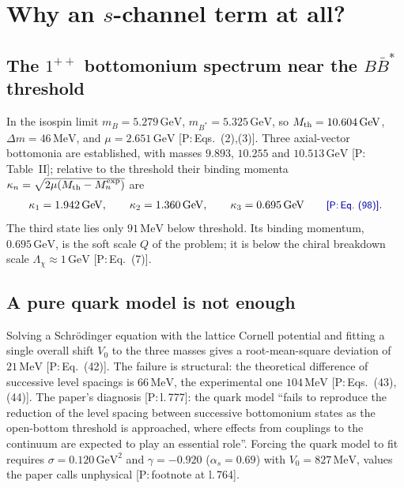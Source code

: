 \documentclass[11pt,a4paper]{article}
\newcommand{\tagP}[1]{\textcolor{blue!65!black}{\textsf{\small[P:\,#1]}}}
\newcommand{\Mth}{M_{\rm th}}
\renewcommand{\GeV}{\,\mathrm{GeV}}
\renewcommand{\MeV}{\,\mathrm{MeV}}
\begin{document}
\section{Why an $s$-channel term at all?}
\label{sec:why}

\subsection{The $1^{++}$ bottomonium spectrum near the $B\bar B^*$ threshold}

In the isospin limit $m_B=5.279\GeV$, $m_{B^*}=5.325\GeV$, so $\Mth=10.604\GeV$, $\Delta m=46\MeV$, and $\mu=2.651\GeV$ \tagP{Eqs.~(2),(3)}. Three axial-vector bottomonia are established, with masses $9.893$, $10.255$ and $10.513\GeV$ \tagP{Table~II}; relative to the threshold their binding momenta $\kappa_n=\sqrt{2\mu(\Mth-M_n^{\rm exp})}$ are
\begin{equation}
\kappa_1=1.942\GeV,\qquad \kappa_2=1.360\GeV,\qquad \kappa_3=0.695\GeV \qquad\text{\tagP{Eq.~(98)}}.
\end{equation}
The third state lies only $91\MeV$ below threshold. Its binding momentum, $0.695\GeV$, is the soft scale $Q$ of the problem; it is below the chiral breakdown scale $\Lambda_\chi\approx1\GeV$ \tagP{Eq.~(7)}.

\subsection{A pure quark model is not enough}

Solving a Schr\"odinger equation with the lattice Cornell potential and fitting a single overall shift $V_0$ to the three masses gives a root-mean-square deviation of $21\MeV$ \tagP{Eq.~(42)}. The failure is structural: the theoretical difference of successive level spacings is $66\MeV$, the experimental one $104\MeV$ \tagP{Eqs.~(43),(44)}. The paper's diagnosis \tagP{l.\,777}: the quark model ``fails to reproduce the reduction of the level spacing between successive bottomonium states as the open-bottom threshold is approached, where effects from couplings to the continuum are expected to play an essential role''. Forcing the quark model to fit requires $\sigma=0.120\GeV^2$ and $\gamma=-0.920$ ($\alpha_s=0.69$) with $V_0=827\MeV$, values the paper calls unphysical \tagP{footnote at l.\,764}.
\end{document}
